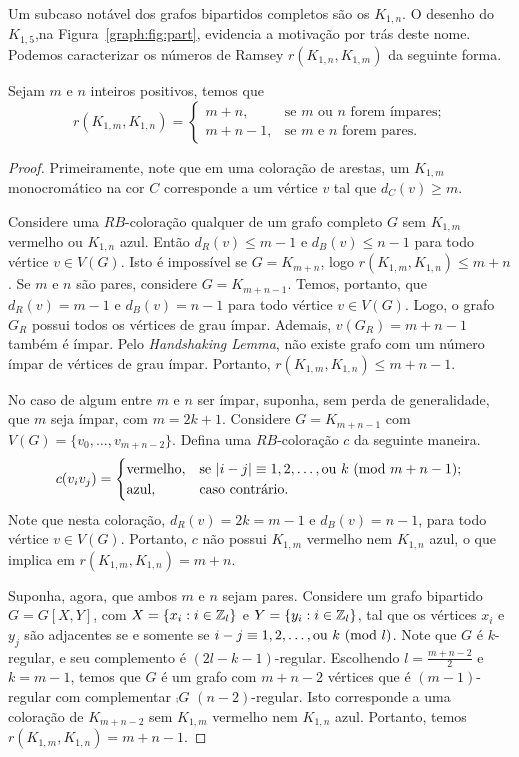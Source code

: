 Um subcaso notável dos grafos bipartidos completos são os  $K_{1,n}$. O desenho do $K_{1,5}$,na Figura~\ref{graph:fig:part}, evidencia a motivação por trás deste nome. Podemos caracterizar os números de Ramsey $r(K_{1,n}, K_{1,m})$ da seguinte forma.

\begin{theorem}
Sejam $m$ e $n$ inteiros positivos, temos que
\[r(K_{1,m}, K_{1,n}) = \begin{cases}
  m + n , & \text{se } m \text{ ou } n  \text{ forem ímpares;} \\
  m + n - 1, & \text{se } m \text{ e } n \text{ forem pares.}
\end{cases}\]
\end{theorem}
\begin{proof}
Primeiramente, note que em uma coloração de arestas, um $K_{1,m}$ monocromático na cor $C$ corresponde a um vértice $v$ tal que $d_C(v) \geq m$.

Considere uma $RB$-coloração qualquer de um grafo completo $G$ sem $K_{1,m}$ vermelho ou $K_{1,n}$ azul. Então $d_R(v) \leq m-1$ e $d_B(v) \leq n-1$ para todo vértice $v \in V(G)$. Isto é impossível se $G = K_{m+n}$, logo $r(K_{1,m}, K_{1,n}) \leq m+n$.
Se $m$ e $n$ são pares, considere $G = K_{m+n-1}$. Temos, portanto, que $d_R(v) = m-1$ e $d_B(v) = n-1$ para todo vértice $v \in V(G)$. Logo, o grafo $G_R$ possui todos os vértices de grau ímpar. Ademais, $v(G_R) = m + n -1$ também é ímpar. Pelo \emph{Handshaking Lemma}, não existe grafo com um número ímpar de vértices de grau ímpar. Portanto, $r(K_{1,m}, K_{1,n}) \leq m + n - 1$.

No caso de algum entre $m$ e $n$ ser ímpar, suponha, sem perda de generalidade, que $m$ seja ímpar, com $m = 2k + 1$. Considere $G  = K_{m+n-1}$ com $V(G) = \{ v_0, \dots, v_{m+n-2} \}$. Defina uma $RB$-coloração $c$ da seguinte maneira.
\[c(v_i v_j) = \begin{cases}
  \text{vermelho}, & \text{se }  |i - j| \equiv 1, 2, \dots, \text{ou } k \ (\text{mod}\ m+n-1); \\
  \text{azul}, & \text{caso contrário}.
\end{cases}\]
Note que nesta coloração, $d_R(v) = 2k = m - 1$ e $d_B(v) = n - 1$, para todo vértice $v \in V(G)$. Portanto, $c$ não possui $K_{1,m}$ vermelho nem $K_{1,n}$ azul, o que implica em $r(K_{1,m}, K_{1,n}) = m + n$.

Suponha, agora, que ambos $m$ e $n$ sejam pares. Considere um grafo bipartido $G = G[X,Y]$, com $X = \{ x_i : i \in \mathbb{Z}_{l} \}$ e $Y = \{ y_i : i \in \mathbb{Z}_{l} \}$, tal que os vértices $x_i$ e $y_j$ são adjacentes se e somente se $i - j \equiv 1, 2, \dots, \text{ou } k \ (\text{mod}\ l)$. Note que $G$ é $k$-regular, e seu complemento é $(2l - k - 1)$-regular.
Escolhendo $l = \frac{m + n -2}{2}$ e $k = m-1$, temos que $G$ é um grafo com $m + n - 2$ vértices que é $(m-1)$-regular com complementar $\comp{G}$ $(n-2)$-regular. Isto corresponde a uma coloração de $K_{m + n - 2}$ sem $K_{1,m}$ vermelho nem $K_{1,n}$ azul. Portanto, temos $r(K_{1,m}, K_{1,n}) = m + n - 1$.
\end{proof}

